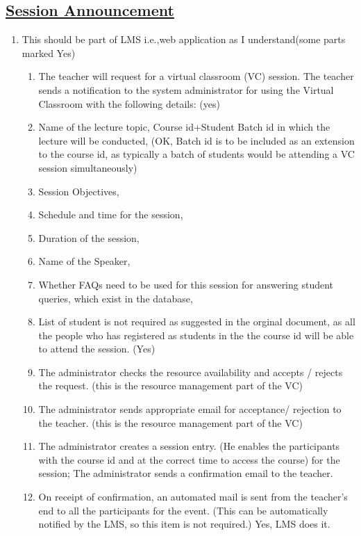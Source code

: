 \documentclass{article}
\begin{document}
\subsection*{\underline{Session Announcement}}
\begin{enumerate}
\item[{}{}]
This should be part of LMS i.e.,web application as I understand(some parts marked Yes)
\begin{enumerate}

\item The teacher will request for a virtual classroom (VC) session. The teacher sends a notification to the system administrator for using the Virtual Classroom with the following details: (yes) 

\item Name of the lecture topic, Course id+Student Batch id in which the lecture will be conducted, (OK, Batch id is to be included as an extension to the course id, as typically a batch of students would be attending a VC session simultaneously)

 \item Session Objectives, 

\item Schedule and time for the session, 

\item Duration of the session, 

\item Name of the Speaker, 

\item Whether FAQs need to be used for this session for answering student queries, which exist in the database, 

\item List of student is not required as suggested in the orginal document, as all the people who has registered as students in the the course id will be able to attend the session. (Yes) 

\item The administrator checks the resource availability and accepts / rejects the request. (this is the resource management part of  the VC) 

\item The administrator sends appropriate email for acceptance/ rejection to the teacher. (this is the resource management part of  the VC) 

\item The administrator creates a session entry. (He enables the participants with the course id and at the correct time to access the course) for the session;  
The administrator sends a confirmation email to the teacher. 

\item On receipt of confirmation, an automated mail is sent from the teacher's end to all the participants for the event. (This can be automatically notified by the LMS, so this item is not required.) Yes, LMS does it. 
\end{enumerate}
\end{enumerate}
\end{document}
